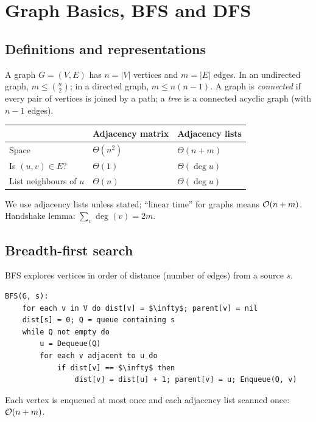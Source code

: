 \chapter{Graph Basics, BFS and DFS}


\section{Definitions and representations}
A graph $G=(V,E)$ has $n=|V|$ vertices and $m=|E|$ edges. In an undirected graph, $m\le\binom n2$; in a directed graph, $m\le n(n-1)$.
A graph is \emph{connected} if every pair of vertices is joined by a path; a \emph{tree} is a connected acyclic graph (with $n-1$ edges).

\begin{center}
\begin{tabular}{lll}
\toprule
 & Adjacency matrix & Adjacency lists \\
\midrule
Space & $\Theta(n^2)$ & $\Theta(n+m)$ \\
Is $(u,v)\in E$? & $\Theta(1)$ & $\Theta(\deg u)$ \\
List neighbours of $u$ & $\Theta(n)$ & $\Theta(\deg u)$ \\
\bottomrule
\end{tabular}
\end{center}
We use adjacency lists unless stated; ``linear time'' for graphs means $\mathcal{O}(n+m)$.
Handshake lemma: $\sum_v\deg(v)=2m$.

\section{Breadth-first search}
BFS explores vertices in order of distance (number of edges) from a source $s$.
\begin{lstlisting}[style=pseudo]
BFS(G, s):
    for each v in V do dist[v] = $\infty$; parent[v] = nil
    dist[s] = 0; Q = queue containing s
    while Q not empty do
        u = Dequeue(Q)
        for each v adjacent to u do
            if dist[v] == $\infty$ then
                dist[v] = dist[u] + 1; parent[v] = u; Enqueue(Q, v)
\end{lstlisting}
Each vertex is enqueued at most once and each adjacency list scanned once: $\mathcal{O}(n+m)$.

